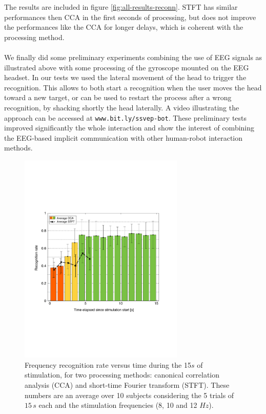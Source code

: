 \documentclass[smallextended]{svjour3}
\begin{document}
The results are included in figure \ref{fig:all-results-reconn}. STFT has similar performances then CCA in the first seconds of processing, but does not improve the performances like the CCA for longer delays, which is coherent with the processing method. \\
\\
We finally did some preliminary experiments combining the use of EEG signals as illustrated above with some processing of the gyroscope mounted on the EEG headset. In our tests we used the lateral movement of the head to trigger the recognition. This allows to both start a recognition when the user moves the head toward a new target, or can be used to restart the process after a wrong recognition, by shacking shortly the head laterally. A video illustrating the approach can be accessed at \verb"www.bit.ly/ssvep-bot". These preliminary tests improved significantly the whole interaction and show the interest of combining the EEG-based implicit communication with other human-robot interaction methods.

\begin{figure}
\center
\includegraphics[width=0.7\textwidth]{figures/all_time_reconn.pdf}
\caption{Frequency recognition rate versus time during the 15$s$ of stimulation, for two processing methods: canonical correlation analysis (CCA) and short-time Fourier transform (STFT). These numbers are an average over 10 subjects considering the 5 trials of $15\,s$ each and the stimulation frequencies (8, 10 and 12 $Hz$).} \label{fig:all_time_reconn}
\end{figure}
\end{document}
